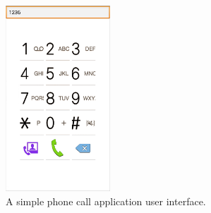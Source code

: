\begin{figure}[H]
\centering
\includegraphics[width=0.35\textwidth]{example_scenario_default.png}
\caption{A simple phone call application user interface.}
\label{fig:example_scenario_default}
\end{figure}

